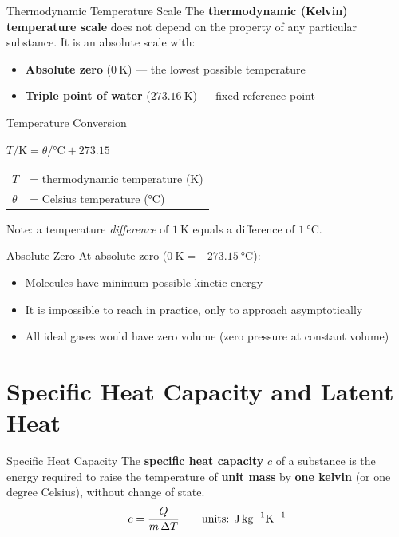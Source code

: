 \begin{definitionbox}{Thermodynamic Temperature Scale}
The \textbf{thermodynamic (Kelvin) temperature scale} does not depend on the property of any particular substance. It is an absolute scale with:
\begin{itemize}[itemsep=2pt]
  \item \textbf{Absolute zero} ($0\ \text{K}$) --- the lowest possible temperature
  \item \textbf{Triple point of water} ($273.16\ \text{K}$) --- fixed reference point
\end{itemize}
\end{definitionbox}

\begin{formulabox}{Temperature Conversion}
\begin{center}
\Large $T/\text{K} = \theta/\text{°C} + 273.15$
\end{center}
\vspace{0.3em}
\begin{tabular}{@{}ll@{}}
$T$ & = thermodynamic temperature (K) \\
$\theta$ & = Celsius temperature (°C) \\
\end{tabular}

\medskip
Note: a temperature \emph{difference} of $1\ \text{K}$ equals a difference of $1\ \text{°C}$.
\end{formulabox}

\begin{keybox}{Absolute Zero}
At absolute zero ($0\ \text{K} = -273.15\ \text{°C}$):
\begin{itemize}[itemsep=2pt]
  \item Molecules have minimum possible kinetic energy
  \item It is impossible to reach in practice, only to approach asymptotically
  \item All ideal gases would have zero volume (zero pressure at constant volume)
\end{itemize}
\end{keybox}

\section{Specific Heat Capacity and Latent Heat}

\begin{definitionbox}{Specific Heat Capacity}
The \textbf{specific heat capacity} $c$ of a substance is the energy required to raise the temperature of \textbf{unit mass} by \textbf{one kelvin} (or one degree Celsius), without change of state.
$$c = \frac{Q}{m\,\Delta T} \qquad \text{units: J\,kg}^{-1}\text{K}^{-1}$$
\end{definitionbox}

